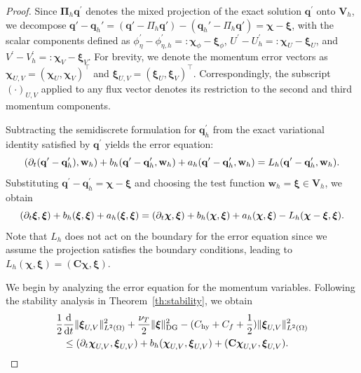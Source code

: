 \documentclass[pdflatex,sn-mathphys-num]{sn-jnl}%
\theoremstyle{thmstyleone}%
\theoremstyle{thmstyletwo}%
\theoremstyle{thmstylethree}%
\begin{document}
\begin{proof}
Since $\boldsymbol{\Pi}_h \mathbf{q}^\prime$ denotes the mixed projection of the exact solution $\mathbf{q}^\prime$ onto $\mathbf{V}_h$, we 
decompose $\mathbf q'-\mathbf q_h'=(\mathbf q'-\Pi_h\mathbf q')-(\mathbf q_h'-\Pi_h\mathbf q')=\boldsymbol\chi-\boldsymbol\xi$,
with the scalar components defined as $\phi_\eta^{\prime}-\phi_{\eta,h}^{\prime}=:\boldsymbol{\chi}_\phi-\boldsymbol{\xi}_\phi$, $U^{\prime}-U_{h}^{\prime}=:\boldsymbol{\chi}_U-\boldsymbol{\xi}_U$, and $V^{\prime}-V_{h}^{\prime}=:\boldsymbol{\chi}_V-\boldsymbol{\xi}_V$.
For brevity, we denote the momentum error vectors as $\boldsymbol{\chi}_{U,V} = (\boldsymbol{\chi}_U, \boldsymbol{\chi}_V)^\top$ and $\boldsymbol{\xi}_{U,V} = (\boldsymbol{\xi}_U, \boldsymbol{\xi}_V)^\top$.
Correspondingly, the subscript $(\cdot)_{U,V}$ applied to any flux vector denotes its restriction to the second and third momentum components.

Subtracting the semidiscrete formulation for $\mathbf{q}^{\prime}_h$ from the exact variational identity satisfied by $\mathbf{q}^{\prime}$ yields the error equation:
\begin{equation}\notag
(\partial_t (\mathbf{q}^{\prime}-\mathbf{q}_h^{\prime}), \mathbf{w}_h) + b_h(\mathbf{q}^{\prime}-\mathbf{q}_h^{\prime}, \mathbf{w}_h) + a_h(\mathbf{q}^{\prime}-\mathbf{q}_h^{\prime}, \mathbf{w}_h) = L_h(\mathbf{q}^{\prime}-\mathbf{q}_h^{\prime}, \mathbf{w}_h).
\end{equation}
Substituting $\mathbf{q}^{\prime}-\mathbf{q}_h^{\prime} = \boldsymbol{\chi} - \boldsymbol{\xi}$ and choosing the test function $\mathbf{w}_h = \boldsymbol{\xi} \in \mathbf{V}_h$, we obtain
\begin{equation}\notag
(\partial_t \boldsymbol{\xi}, \boldsymbol{\xi}) + b_h(\boldsymbol{\xi}, \boldsymbol{\xi}) +a_h(\boldsymbol{\xi}, \boldsymbol{\xi}) = (\partial_t \boldsymbol{\chi}, \boldsymbol{\xi}) +  b_h(\boldsymbol{\chi}, \boldsymbol{\xi}) + a_h(\boldsymbol{\chi}, \boldsymbol{\xi}) - L_h(\boldsymbol{\chi} - \boldsymbol{\xi}, \boldsymbol{\xi}).
\end{equation}
Note that $L_h$ does not act on the boundary for the error equation since we assume the projection satisfies the boundary conditions, leading to $L_h(\boldsymbol{\chi}, \boldsymbol{\xi}) = (\mathbf{C}\boldsymbol{\chi}, \boldsymbol{\xi})$.

We begin by analyzing the error equation for the momentum variables. Following the stability analysis in Theorem~\ref{th:stability}, we obtain
\begin{equation}\notag
\begin{aligned}
    \frac{1}{2}&\frac{\mathrm{d}}{\mathrm{d}t}\|\boldsymbol{\xi}_{U,V}\|_{L^2(\Omega)}^2
+ \frac{\nu_T}{2}\|\boldsymbol{\xi}\|_{\mathrm{DG}}^2 -
(C_{\mathrm{hy}}+ C_f + \frac{1}{2})\|\boldsymbol{\xi}_{U,V}\|_{L^2(\Omega)}^2 \\
               &\le (\partial_t \boldsymbol{\chi}_{U,V}, \boldsymbol{\xi}_{U,V}) + b_h(\boldsymbol{\chi}_{U,V}, \boldsymbol{\xi}_{U,V}) + (\mathbf{C}\boldsymbol{\chi}_{U,V}, \boldsymbol{\xi}_{U,V}).
\end{aligned}
\end{equation}


\end{proof}
\end{document}

